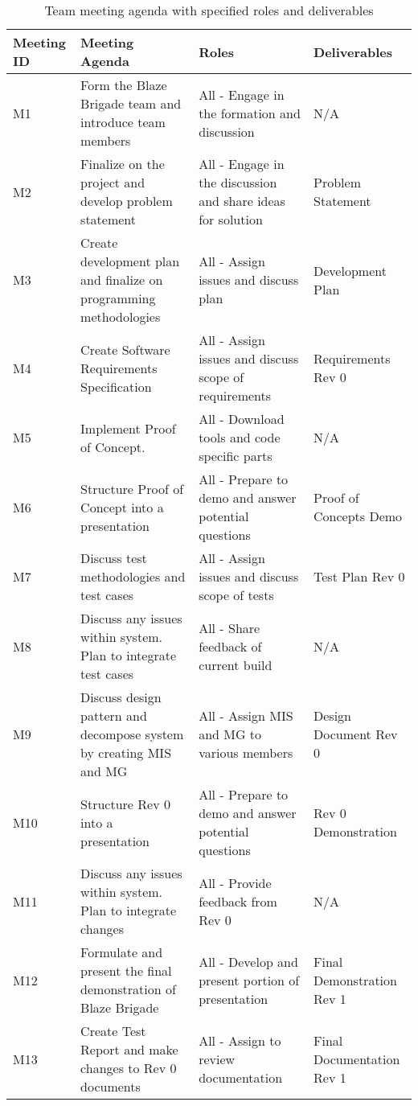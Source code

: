 \documentclass{article}
\begin{document}
\begin{table}
\caption{Team meeting agenda with specified roles and deliverables} \label{TblTeamMeetingAgenda}
\begin{tabular}{|L|L|L|L|}
		\hline
		Meeting ID & Meeting Agenda & Roles & Deliverables \\
		\hline
		M1 & Form the Blaze Brigade team and introduce team members & All - Engage in the formation and discussion & N/A\\
		\hline
		M2 & Finalize on the project and develop problem statement  & All - Engage in the discussion and share ideas for solution & Problem Statement\\
		\hline
		M3 & Create development plan and finalize on programming methodologies & All - Assign issues and discuss plan & Development Plan \\
		\hline
		M4 & Create Software Requirements Specification & All - Assign issues and discuss scope of requirements & Requirements Rev 0 \\
		\hline
		M5 & Implement Proof of Concept. & All - Download tools and code specific parts & N/A \\
		\hline
		M6 & Structure Proof of Concept into a presentation & All - Prepare to demo and answer potential questions & Proof of Concepts Demo\\
		\hline
		M7 & Discuss test methodologies and test cases & All - Assign issues and discuss scope of tests & Test Plan Rev 0\\
		\hline
		M8 & Discuss any issues within system. Plan to integrate test cases & All - Share feedback of current build & N/A \\
		\hline
		M9 & Discuss design pattern and decompose system by creating MIS and MG & All - Assign MIS and MG to various members & Design Document Rev 0\\
		\hline
		M10 & Structure Rev 0 into a presentation & All - Prepare to demo and answer potential questions & Rev 0 Demonstration \\
		\hline
		M11 & Discuss any issues within system. Plan to integrate changes & All - Provide feedback from Rev 0 & N/A \\
		\hline
		M12 & Formulate and present the final demonstration of Blaze Brigade & All - Develop and present portion of presentation & Final Demonstration Rev 1 \\
		\hline
		M13 & Create Test Report and make changes to Rev 0 documents & All - Assign to review documentation & Final Documentation Rev 1 \\
		\hline
\end{tabular}
\end{table}
\end{document}
